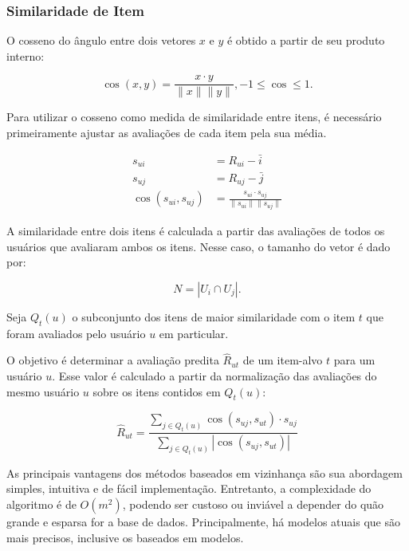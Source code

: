 \subsubsection{Similaridade de Item}

O cosseno do ângulo entre dois vetores $x$ e $y$ é obtido a partir de seu
produto interno:

\begin{equation}
    \cos(x,y) = \frac{x \cdot y}{\|x\| \|y\|}, -1 \leq \cos \leq 1.
\end{equation}

Para utilizar o cosseno como medida de similaridade entre itens, é necessário
primeiramente ajustar as avaliações de cada item pela sua média.

\begin{align}
    s_{ui} &= R_{ui} - \bar{i} \\
    s_{uj} &= R_{uj} - \bar{j} \\
    \cos(s_{ui},s_{uj}) &= \frac{s_{ui} \cdot s_{uj}}{\|s_{ui}\| \|s_{uj}\|}
\end{align}

A similaridade entre dois itens é calculada a partir das avaliações de todos os
usuários que avaliaram ambos os itens. Nesse caso, o tamanho do vetor é dado por:

\begin{equation}
    N = |U_i \cap U_j|.
\end{equation}

Seja $Q_t (u)$ o subconjunto dos itens de maior similaridade com o item $t$ que
foram avaliados pelo usuário $u$ em particular.

O objetivo é determinar a avaliação predita $\hat{R}_{ut}$ de um item-alvo $t$ para um usuário
$u$. Esse valor é calculado a partir da normalização das avaliações do mesmo
usuário $u$ sobre os itens contidos em $Q_t (u)$:

\begin{equation}
    \hat{R}_{ut} = \frac{\sum_{j \in Q_t(u)} \cos(s_{uj},s_{ut}) \cdot s_{uj}}{\sum_{j \in Q_t(u)} |\cos(s_{uj},s_{ut})|}
\end{equation}

As principais vantagens dos métodos baseados em vizinhança são sua abordagem
simples, intuitiva e de fácil implementação. Entretanto, a complexidade do
algoritmo é de $O(m^2)$, podendo ser custoso ou inviável a depender do quão
grande e esparsa for a base de dados. Principalmente, há modelos atuais que são
mais precisos, inclusive os baseados em modelos.

